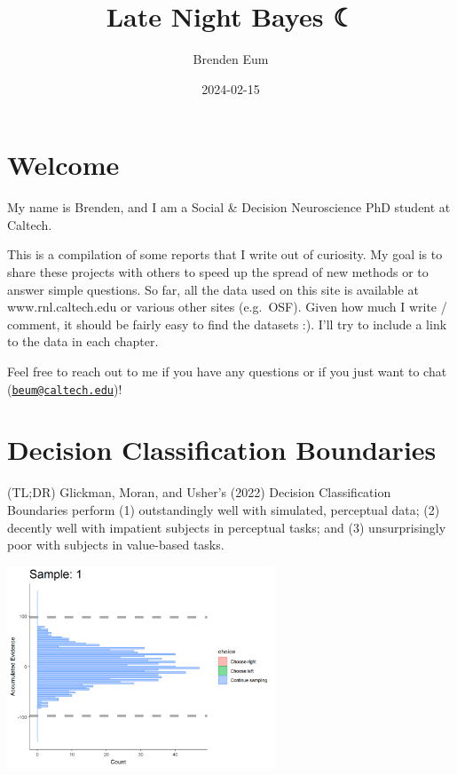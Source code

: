 \documentclass[
]{book}
\title{Late Night Bayes ☾}
\author{Brenden Eum}
\date{2024-02-15}
\begin{document}
\maketitle

{
\setcounter{tocdepth}{1}
\tableofcontents
}
\hypertarget{welcome}{%
\chapter{Welcome}\label{welcome}}

My name is Brenden, and I am a Social \& Decision Neuroscience PhD student at Caltech.

This is a compilation of some reports that I write out of curiosity. My goal is to share these projects with others to speed up the spread of new methods or to answer simple questions. So far, all the data used on this site is available at www.rnl.caltech.edu or various other sites (e.g.~OSF). Given how much I write / comment, it should be fairly easy to find the datasets :). I'll try to include a link to the data in each chapter.

Feel free to reach out to me if you have any questions or if you just want to chat (\href{mailto:beum@caltech.edu}{\nolinkurl{beum@caltech.edu}})!

\hypertarget{dcb}{%
\chapter{Decision Classification Boundaries}\label{dcb}}

(TL;DR) Glickman, Moran, and Usher's (2022) Decision Classification Boundaries perform (1) outstandingly well with simulated, perceptual data; (2) decently well with impatient subjects in perceptual tasks; and (3) unsurprisingly poor with subjects in value-based tasks.

\includegraphics[width=0.6\textwidth,height=\textheight]{images/dcb-collapsingbounds.gif}
\end{document}
